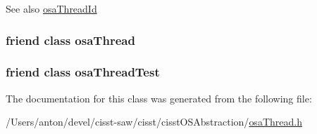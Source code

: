 \begin{DoxySeeAlso}{See also}
\hyperlink{classosa_thread_id}{osa\+Thread\+Id} 
\end{DoxySeeAlso}
\hypertarget{classosa_thread_id_a35e7a1b0202c45103302d0073f377e57}{}
\subsubsection[{osa\+Thread}]{\setlength{\rightskip}{0pt plus 5cm}friend class {\bf osa\+Thread}\hspace{0.3cm}{\ttfamily [friend]}}\label{classosa_thread_id_a35e7a1b0202c45103302d0073f377e57}
\hypertarget{classosa_thread_id_a542e7acdd9a832dddf65bf204d2df936}{}
\subsubsection[{osa\+Thread\+Test}]{\setlength{\rightskip}{0pt plus 5cm}friend class osa\+Thread\+Test\hspace{0.3cm}{\ttfamily [friend]}}\label{classosa_thread_id_a542e7acdd9a832dddf65bf204d2df936}


The documentation for this class was generated from the following file\+:\begin{DoxyCompactItemize}
\item 
/\+Users/anton/devel/cisst-\/saw/cisst/cisst\+O\+S\+Abstraction/\hyperlink{osa_thread_8h}{osa\+Thread.\+h}\end{DoxyCompactItemize}
